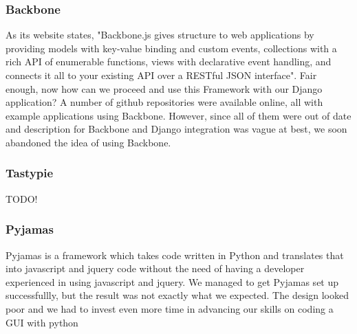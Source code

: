 \documentclass{l3proj}
\begin{document}
{\subsubsection{Backbone}
As its website states, "Backbone.js gives structure to web applications by providing 
models with key-value binding and custom events, collections with a rich API of 
enumerable functions, views with declarative event handling, and connects it all to 
your existing API over a RESTful JSON interface". Fair enough, now how can we 
proceed and use this Framework with our Django application? A number of github 
repositories were available online, all with example applications using Backbone. 
However, since all of them were out of date and description for Backbone and 
Django integration was vague at best, we soon abandoned the idea of using 
Backbone. 
\subsubsection{Tastypie}
TODO!
\subsubsection{Pyjamas}
Pyjamas is a framework which takes code written in Python and translates that 
into javascript and jquery code without the need of having a developer experienced 
in using javascript and jquery. We managed to get Pyjamas set up successfullly, 
but the result was not exactly what we expected. The design looked poor and we 
had to invest even more time in advancing our skills on coding a GUI with python
}
\end{document}
